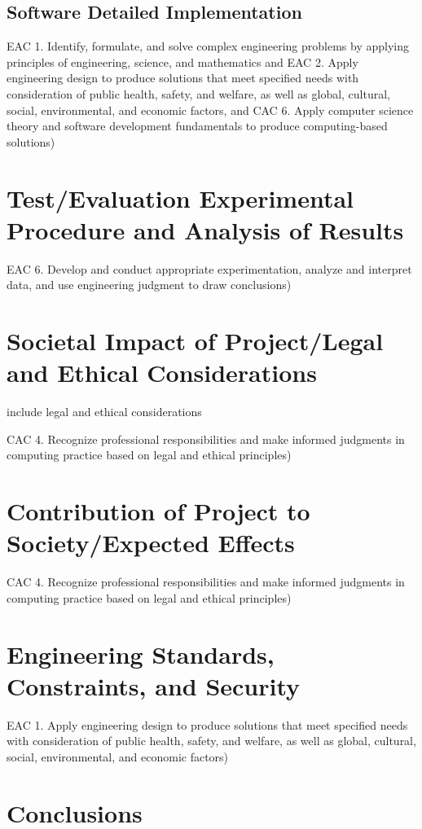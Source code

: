 \documentclass{article}
\begin{document}
\subsection{Software Detailed Implementation}
EAC 1. Identify, formulate, and solve complex engineering problems by 
applying principles of engineering, science, and mathematics and EAC 2. 
Apply engineering design to produce solutions that meet specified needs with 
consideration of public health, safety, and welfare, as well as global, cultural, 
social, environmental, and economic factors, and CAC 6. Apply computer 
science theory and software development fundamentals to produce 
computing-based solutions) 

\section{Test/Evaluation Experimental Procedure and Analysis of Results} 
EAC 6. Develop and conduct appropriate experimentation, analyze and interpret 
data, and use engineering judgment to draw conclusions) 

\section{Societal Impact of Project\slash Legal and Ethical Considerations} 
include legal and ethical considerations 

CAC 4. Recognize professional responsibilities and make informed judgments in 
computing practice based on legal and ethical principles) 

\section{Contribution of Project to Society\slash Expected Effects}
CAC 4. Recognize professional responsibilities and make informed judgments in 
computing practice based on legal and ethical principles) 

\section{Engineering Standards, Constraints, and Security}
EAC 1. Apply engineering design to produce solutions that meet specified needs with consideration of public health, 
safety, and welfare, as well as global, cultural, social, environmental, and economic 
factors) 
\section{Conclusions}
\end{document}
